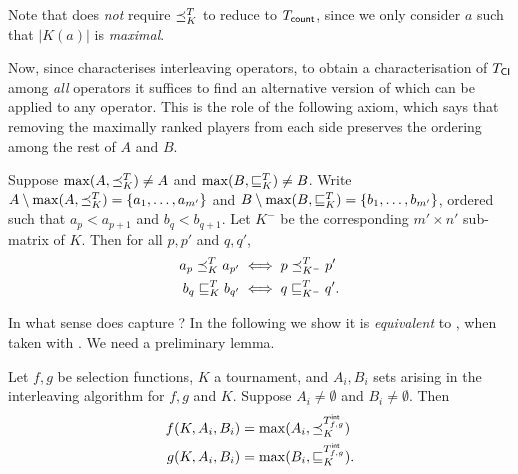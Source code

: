 Note that \argmaxaxiom{} does \emph{not} require $\preceq_K^T$ to reduce to
${T_{\mathsf{count}}}$, since we only consider $a$ such that $|K(a)|$ is \emph{maximal}.

Now, since \chaindef{} characterises interleaving operators, to obtain
a characterisation of ${T_{\mathsf{CI}}}$ among \emph{all} operators it suffices to
find an alternative version of \smi{} which can be applied to any
operator. This is the role of the following axiom, which says that removing the
maximally ranked players from each side preserves the ordering among the rest
of $A$ and $B$.

\begin{axiom}[\rankremoval{}]
    Suppose $\max(A, {\preceq_K^T}) \ne A$ and $\max(B, {\sqsubseteq_K^T}) \ne B$.
    Write $A \setminus \max(A, {\preceq_K^T}) = \{a_1, \ldots, a_{m'}\}$ and $B
    \setminus \max(B, {\sqsubseteq_K^T}) = \{b_1, \ldots, b_{m'}\}$, ordered such
    that $a_p < a_{p+1}$ and $b_q < b_{q+1}$. Let $K^-$ be the corresponding
    $m' \times n'$ sub-matrix of $K$. Then for all $p, p'$ and $q, q'$,
    \begin{align*}
        a_p \preceq_K^T a_{p'} &\iff p \preceq_{K^-}^T p' \\
        b_q \sqsubseteq_K^T b_{q'} &\iff q \sqsubseteq_{K^-}^T q'.
    \end{align*}
\end{axiom}

In what sense does \rankremoval{} capture \smi{}? In the
following we show it is \emph{equivalent} to \smi{}, when taken with
\chaindef{}. We need a preliminary lemma.

\begin{lemma}
    \label{tourn_result_selectionfunction_lemma}
    Let $f, g$ be selection functions, $K$ a tournament, and $A_i, B_i$ sets
    arising in the interleaving algorithm for $f, g$ and $K$. Suppose $A_i \ne
    \emptyset$ and $B_i \ne \emptyset$. Then
    \begin{align*}
        f(K, A_i, B_i) &= \max(A_i, {\preceq_K^{{T_{f, g}^\mathsf{int}}}}) \\
        g(K, A_i, B_i) &= \max(B_i, {\sqsubseteq_K^{{T_{f, g}^\mathsf{int}}}}).
    \end{align*}
\end{lemma}

